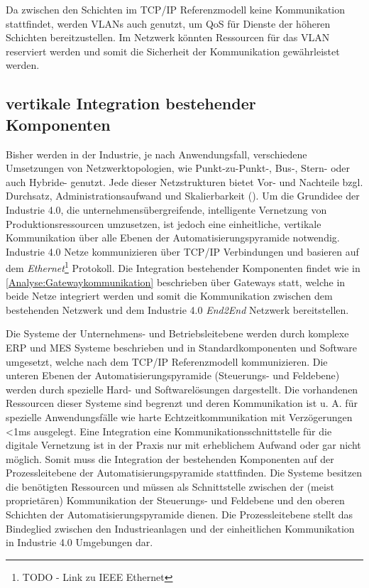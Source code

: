 Da zwischen den Schichten im \ac{TCP}/\ac{IP} Referenzmodell keine Kommunikation stattfindet, werden \ac{VLAN}s auch genutzt, um \ac{QoS} für Dienste der höheren Schichten bereitzustellen. Im Netzwerk könnten Ressourcen für das \ac{VLAN} reserviert werden und somit die Sicherheit der Kommunikation gewährleistet werden. 

\subsection{vertikale Integration bestehender Komponenten}
Bisher werden in der Industrie, je nach Anwendungsfall, verschiedene Umsetzungen von Netzwerktopologien, wie Punkt-zu-Punkt-, Bus-, Stern- oder auch Hybride- genutzt. Jede dieser Netzstrukturen bietet Vor- und Nachteile bzgl. Durchsatz, Administrationsaufwand und Skalierbarkeit (\cite{burke2013}). Um die Grundidee der Industrie 4.0, die unternehmensübergreifende, intelligente Vernetzung von Produktionsressourcen umzusetzen, ist jedoch eine einheitliche, vertikale Kommunikation über alle Ebenen der Automatisierungspyramide notwendig. Industrie 4.0 Netze kommunizieren über \ac{TCP}/\ac{IP} Verbindungen und basieren auf dem \textit{Ethernet}\footnote{TODO - Link zu IEEE Ethernet} Protokoll. Die Integration bestehender Komponenten findet wie in \autoref{Analyse:Gatewaykommunikation} beschrieben über Gateways statt, welche in beide Netze integriert werden und somit die Kommunikation zwischen dem bestehenden Netzwerk und dem Industrie 4.0 \textit{End2End} Netzwerk bereitstellen.

Die Systeme der Unternehmens- und Betriebsleitebene werden durch komplexe \ac{ERP} und \ac{MES} Systeme beschrieben und in Standardkomponenten und Software umgesetzt, welche nach dem \ac{TCP}/\ac{IP} Referenzmodell kommunizieren. Die unteren Ebenen der Automatisierungspyramide (Steuerungs- und Feldebene) werden durch spezielle Hard- und Softwarelösungen dargestellt. Die vorhandenen Ressourcen dieser Systeme sind begrenzt und deren Kommunikation ist u. A. für spezielle Anwendungsfälle wie harte Echtzeitkommunikation mit Verzögerungen <1ms ausgelegt. Eine Integration eine Kommunikationsschnittstelle für die digitale Vernetzung ist in der Praxis nur mit erheblichem Aufwand oder gar nicht möglich. Somit muss die Integration der bestehenden Komponenten auf der Prozessleitebene der Automatisierungspyramide stattfinden. Die Systeme besitzen die benötigten Ressourcen und müssen als Schnittstelle zwischen der (meist proprietären) Kommunikation der Steuerungs- und Feldebene und den oberen Schichten der Automatisierungspyramide dienen. Die Prozessleitebene stellt das Bindeglied zwischen den Industrieanlagen und der einheitlichen Kommunikation in Industrie 4.0 Umgebungen dar. 

